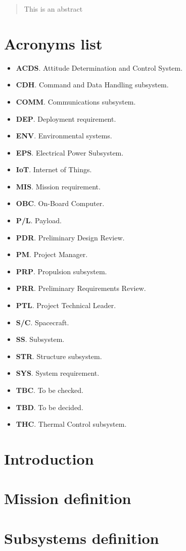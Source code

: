 \begin{abstract}
This is an abstract
\end{abstract}

\section*{Acronyms list}

\begin{itemize}
	\item \textbf{ACDS}. Attitude Determination and Control System.
	\item \textbf{CDH}. Command and Data Handling subsystem.
	\item \textbf{COMM}. Communications subsystem.
	\item \textbf{DEP}. Deployment requirement.
	\item \textbf{ENV}. Environmental systems.
	\item \textbf{EPS}. Electrical Power Subsystem.
	\item \textbf{IoT}. Internet of Things.
	\item \textbf{MIS}. Mission requirement.
	\item \textbf{OBC}. On-Board Computer.
	\item \textbf{P/L}. Payload.
	\item \textbf{PDR}. Preliminary Design Review.
	\item \textbf{PM}. Project Manager.
	\item \textbf{PRP}. Propulsion subsystem.
	\item \textbf{PRR}. Preliminary Requirements Review.
	\item \textbf{PTL}. Project Technical Leader.
	\item \textbf{S/C}. Spacecraft.
	\item \textbf{SS}. Subsystem.
	\item \textbf{STR}. Structure subsystem.
	\item \textbf{SYS}. System requirement.
	\item \textbf{TBC}. To be checked.
	\item \textbf{TBD}. To be decided.
	\item \textbf{THC}. Thermal Control subsystem.
\end{itemize}

\section{Introduction}

\section{Mission definition}

\section{Subsystems definition}
